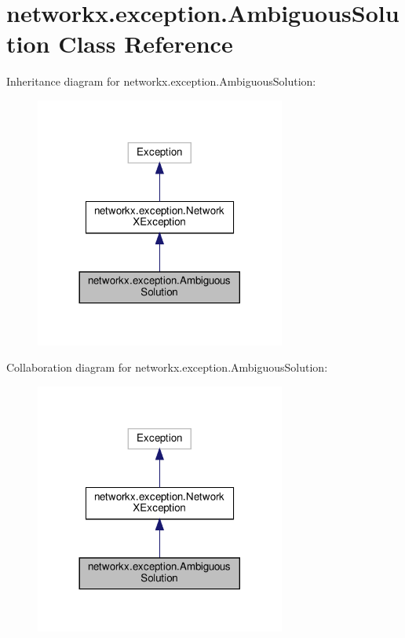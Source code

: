 \hypertarget{classnetworkx_1_1exception_1_1AmbiguousSolution}{}\section{networkx.\+exception.\+Ambiguous\+Solution Class Reference}
\label{classnetworkx_1_1exception_1_1AmbiguousSolution}


Inheritance diagram for networkx.\+exception.\+Ambiguous\+Solution\+:
\nopagebreak
\begin{figure}[H]
\begin{center}
\leavevmode
\includegraphics[width=233pt]{classnetworkx_1_1exception_1_1AmbiguousSolution__inherit__graph}
\end{center}
\end{figure}


Collaboration diagram for networkx.\+exception.\+Ambiguous\+Solution\+:
\nopagebreak
\begin{figure}[H]
\begin{center}
\leavevmode
\includegraphics[width=233pt]{classnetworkx_1_1exception_1_1AmbiguousSolution__coll__graph}
\end{center}
\end{figure}


